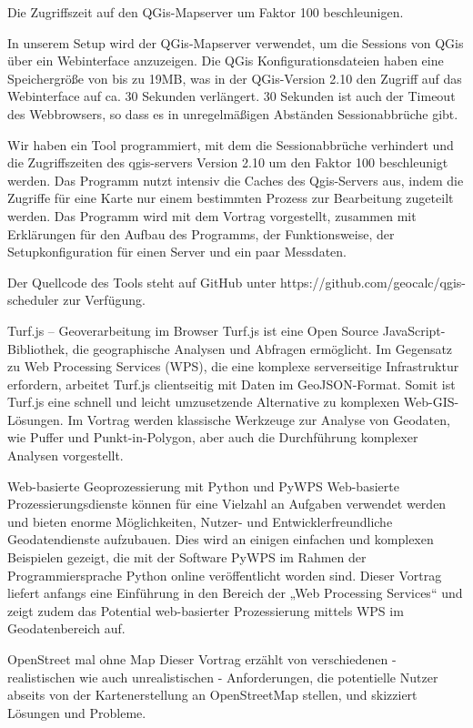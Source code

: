 %
{Die Zugriffszeit auf den QGis-Mapserver um Faktor 100 beschleunigen.}%
{}%
{In unserem Setup wird der QGis-Mapserver verwendet, um die Sessions von QGis
über ein Webinterface anzuzeigen. Die QGis Konfigurationsdateien haben eine
Speichergröße von bis zu 19MB, was in der QGis-Version 2.10 den Zugriff
auf das Webinterface auf ca.
30 Sekunden verlängert. 30 Sekunden ist auch der Timeout des Webbrowsers,
so dass es in unregelmäßigen Abständen Sessionabbrüche gibt.


Wir haben ein Tool programmiert, mit dem die Sessionabbrüche verhindert und
die Zugriffszeiten des qgis-servers Version 2.10 um den Faktor 100
beschleunigt werden. Das Programm nutzt intensiv die Caches des
Qgis-Servers aus, indem die Zugriffe für eine Karte nur einem bestimmten
Prozess zur Bearbeitung zugeteilt werden.
Das Programm wird mit dem Vortrag vorgestellt, zusammen mit Erklärungen
für den Aufbau des Programms, der Funktionsweise, der Setupkonfiguration
für einen Server und ein paar Messdaten.

Der Quellcode des Tools steht auf GitHub unter
https://github.com/geocalc/qgis-scheduler zur Verfügung.}

%
{Turf.js – Geoverarbeitung im Browser}%
{}%
{Turf.js ist eine Open Source JavaScript-Bibliothek, die geographische Analysen und Abfragen ermöglicht.
Im Gegensatz zu Web Processing Services (WPS), die eine komplexe serverseitige Infrastruktur erfordern,
arbeitet Turf.js clientseitig mit Daten im GeoJSON-Format. Somit ist Turf.js eine schnell und leicht
umzusetzende Alternative zu komplexen Web-GIS-Lösungen.
Im Vortrag werden klassische Werkzeuge zur Analyse von Geodaten, wie Puffer und Punkt-in-Polygon, aber auch
die Durchführung komplexer Analysen vorgestellt.}

%
{Web-basierte Geoprozessierung mit Python und PyWPS}%
{}%
{Web-basierte Prozessierungsdienste können für eine Vielzahl an Aufgaben verwendet werden und bieten enorme Möglichkeiten,
Nutzer- und Entwicklerfreundliche Geodatendienste aufzubauen. Dies wird an einigen einfachen und komplexen Beispielen gezeigt,
die mit der Software PyWPS im Rahmen der Programmiersprache Python online veröffentlicht worden sind.
Dieser Vortrag liefert anfangs eine Einführung in den Bereich der „Web Processing Services“ und zeigt
zudem das Potential web-basierter Prozessierung mittels WPS im Geodatenbereich auf. }

%
{OpenStreet mal ohne Map}%
{}%
{Dieser Vortrag erzählt von verschiedenen - realistischen wie auch unrealistischen - Anforderungen,
die potentielle Nutzer abseits von der Kartenerstellung an OpenStreetMap stellen, und skizziert Lösungen und Probleme.}

